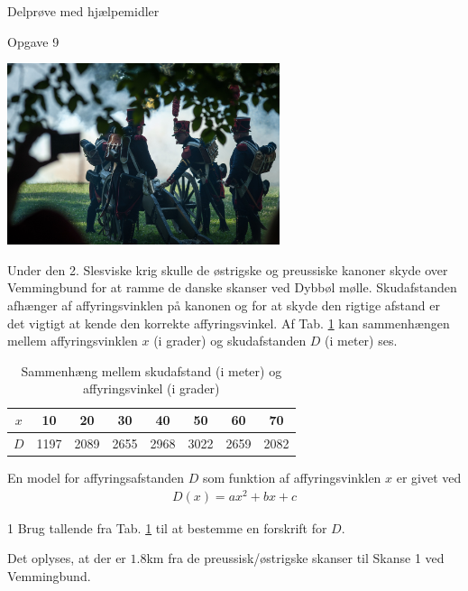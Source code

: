 \newpage
\begin{center}
\LARGE
Delprøve med hjælpemidler 
\end{center}
\begin{opgavetekst}{Opgave 9}
	\begin{center}
		\includegraphics[width=0.6\textwidth]{Billeder/kanon.jpg}
	\end{center}
	Under den 2. Slesviske krig skulle de østrigske og preussiske kanoner skyde over Vemmingbund for at ramme de danske skanser ved Dybbøl mølle. Skudafstanden afhænger af affyringsvinklen på kanonen
	og for at skyde den rigtige afstand er det vigtigt at kende den korrekte affyringsvinkel. Af Tab.  \ref{tab:kanon} kan sammenhængen mellem affyringsvinklen $x$ (i grader) og skudafstanden $D$
	(i meter) ses.
	\begin{table}[H]
		\centering
		\begin{tabular}{c|c|c|c|c|c|c|c}
		$x$ &10 & 20 & 30 & 40 & 50 & 60 & 70 \\
		\hline
		$D$ & 1197 & 2089 & 2655 & 2968 & 3022 & 2659 & 2082
		\end{tabular}
		\caption{Sammenhæng mellem skudafstand (i meter) og affyringsvinkel (i grader)}
		\label{tab:kanon}
	\end{table}\phantom{h}
	En model for affyringsafstanden $D$ som funktion af affyringsvinklen $x$ er givet ved
	\begin{align*}
		D(x) = ax^2+bx+c
	\end{align*}
\end{opgavetekst}
\begin{delopgave}{}{1}
	Brug tallende fra Tab. \ref{tab:kanon} til at bestemme en forskrift for $D$.
\end{delopgave}
\begin{meretekst}
	Det oplyses, at der er $1.8$km fra de preussisk/østrigske skanser til Skanse 1 ved Vemmingbund. 
\end{meretekst}
